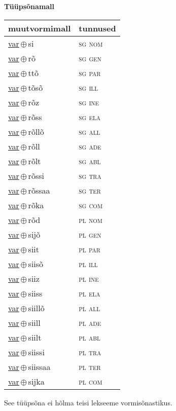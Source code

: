 

\vspace{3.5em}
\noindent \begin{minipage}{\textwidth}
\noindent \textbf{Tüüpsõnamall \,}\\

\begin{sideways}
\begin{tabular}{l l}
muutvormimall & tunnused \\
\hline
\underline{var}\,$\oplus$\,si & \textsc{ sg nom } \\
\underline{var}\,$\oplus$\,rõ & \textsc{ sg gen } \\
\underline{var}\,$\oplus$\,ttõ & \textsc{ sg par } \\
\underline{var}\,$\oplus$\,tõsõ & \textsc{ sg ill } \\
\underline{var}\,$\oplus$\,rõz & \textsc{ sg ine } \\
\underline{var}\,$\oplus$\,rõss & \textsc{ sg ela } \\
\underline{var}\,$\oplus$\,rõllõ & \textsc{ sg all } \\
\underline{var}\,$\oplus$\,rõll & \textsc{ sg ade } \\
\underline{var}\,$\oplus$\,rõlt & \textsc{ sg abl } \\
\underline{var}\,$\oplus$\,rõssi & \textsc{ sg tra } \\
\underline{var}\,$\oplus$\,rõssaa & \textsc{ sg ter } \\
\underline{var}\,$\oplus$\,rõka & \textsc{ sg com } \\
\underline{var}\,$\oplus$\,rõd & \textsc{ pl nom } \\
\underline{var}\,$\oplus$\,sijõ & \textsc{ pl gen } \\
\underline{var}\,$\oplus$\,siit & \textsc{ pl par } \\
\underline{var}\,$\oplus$\,siisõ & \textsc{ pl ill } \\
\underline{var}\,$\oplus$\,siiz & \textsc{ pl ine } \\
\underline{var}\,$\oplus$\,siiss & \textsc{ pl ela } \\
\underline{var}\,$\oplus$\,siillõ & \textsc{ pl all } \\
\underline{var}\,$\oplus$\,siill & \textsc{ pl ade } \\
\underline{var}\,$\oplus$\,siilt & \textsc{ pl abl } \\
\underline{var}\,$\oplus$\,siissi & \textsc{ pl tra } \\
\underline{var}\,$\oplus$\,siissaa & \textsc{ pl ter } \\
\underline{var}\,$\oplus$\,sijka & \textsc{ pl com } \\
\end{tabular}
\end{sideways}
\label{tab:tüüpsõnamall-varsi}

\end{minipage}

 
\vspace{1em}
\noindent See tüüpsõna ei hõlma teisi lekseeme vormi\-sõnastikus.

